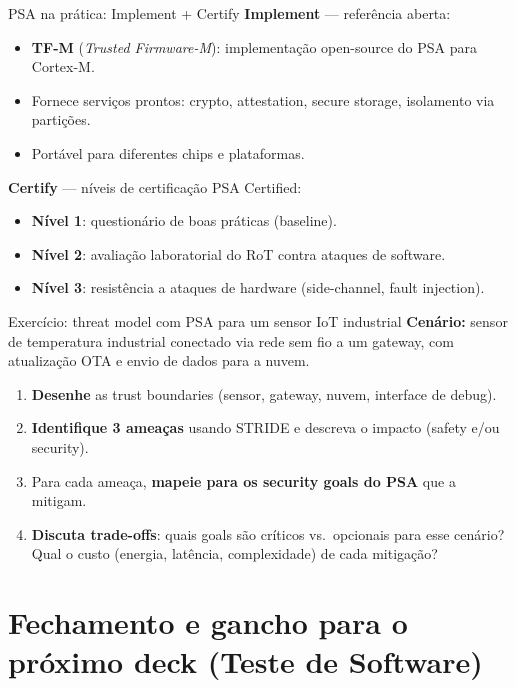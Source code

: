 \documentclass{beamer}
\begin{document}
\begin{frame}{PSA na prática: Implement + Certify}
\textbf{Implement} --- referência aberta:
\begin{itemize}
  \item \textbf{TF-M} (\textit{Trusted Firmware-M}): implementação open-source do PSA para Cortex-M.
  \item Fornece serviços prontos: crypto, attestation, secure storage, isolamento via partições.
  \item Portável para diferentes chips e plataformas.
\end{itemize}

\vspace{0.4em}
\textbf{Certify} --- níveis de certificação PSA Certified:
\begin{itemize}
  \item \textbf{Nível 1}: questionário de boas práticas (baseline).
  \item \textbf{Nível 2}: avaliação laboratorial do RoT contra ataques de software.
  \item \textbf{Nível 3}: resistência a ataques de hardware (side-channel, fault injection).
\end{itemize}
\end{frame}

\iffalse
\begin{frame}{Exercício: threat model com PSA para um sensor IoT industrial}
\small
\textbf{Cenário:} sensor de temperatura industrial conectado via rede sem fio a um gateway, com atualização OTA e envio de dados para a nuvem.

\vspace{0.3em}
\begin{enumerate}
  \item \textbf{Desenhe} as trust boundaries (sensor, gateway, nuvem, interface de debug).
  \item \textbf{Identifique 3 ameaças} usando STRIDE e descreva o impacto (safety e/ou security).
  \item Para cada ameaça, \textbf{mapeie para os security goals do PSA} que a mitigam.
  \item \textbf{Discuta trade-offs}: quais goals são críticos vs.\ opcionais para esse cenário? Qual o custo (energia, latência, complexidade) de cada mitigação?
\end{enumerate}
\end{frame}

\section{Fechamento e gancho para o próximo deck (Teste de Software)}
\end{document}
